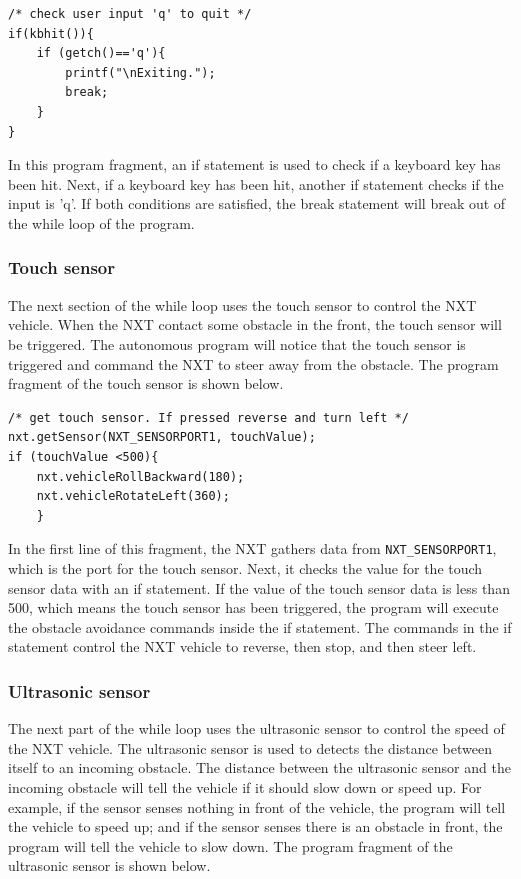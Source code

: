 \documentclass[11pt]{article}
\begin{document}
\begin{verbatim}
/* check user input 'q' to quit */
if(kbhit()){
    if (getch()=='q'){	
        printf("\nExiting.");
        break;
    }
}
\end{verbatim}

In this program fragment, an if statement is used to check if a keyboard key has been hit.
Next, if a keyboard key has been hit, another if statement checks if the input is 'q'.
If both conditions are satisfied, the break statement will break out of the while loop of the program.

\subsubsection*{Touch sensor}
The next section of the while loop uses the touch sensor to control the NXT vehicle.
When the NXT contact some obstacle in the front, the touch sensor will be triggered.
The autonomous program will notice that the touch sensor is triggered and command the 
NXT to steer away from the obstacle. The program fragment of the touch sensor is shown below.

\begin{verbatim}
/* get touch sensor. If pressed reverse and turn left */
nxt.getSensor(NXT_SENSORPORT1, touchValue);
if (touchValue <500){
    nxt.vehicleRollBackward(180);
    nxt.vehicleRotateLeft(360);
    }
\end{verbatim}

In the first line of this fragment, the NXT gathers data from \verb+NXT_SENSORPORT1+, which is the port for the touch sensor.
Next, it checks the value for the touch sensor data with an if statement.
If the value of the touch sensor data is less than 500, which means the touch sensor has been triggered, the program
will execute the obstacle avoidance commands inside the if statement.
The commands in the if statement control the NXT vehicle to reverse, then stop, and then steer left.

\subsubsection*{Ultrasonic sensor}
The next part of the while loop uses the ultrasonic sensor to control the speed of the NXT vehicle.
The ultrasonic sensor is used to detects the distance between itself to an incoming obstacle.
The distance between the ultrasonic sensor and the incoming obstacle will tell the vehicle if it should slow down or
    speed up.
For example, if the sensor senses nothing in front of the vehicle, the program will tell the vehicle to speed up; and
if the sensor senses there is an obstacle in front, the program will tell the vehicle to slow down.
The program fragment of the ultrasonic sensor is shown below.
\end{document}
